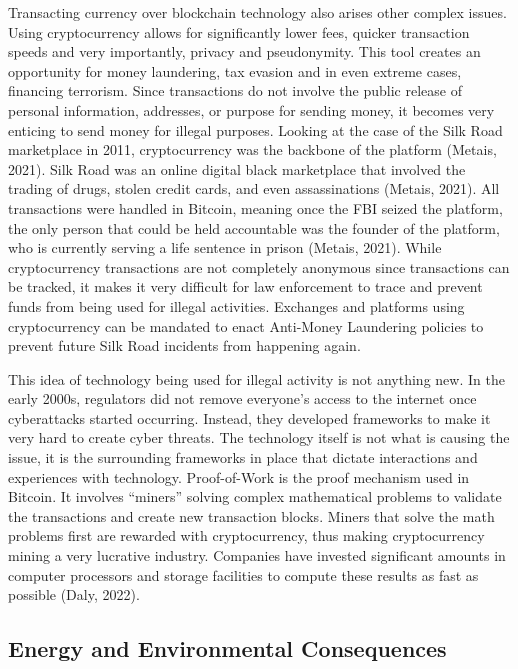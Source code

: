 \documentclass{article}
\begin{document}
\noindent 
Transacting currency over blockchain technology also arises other complex issues. Using cryptocurrency allows for significantly lower fees, quicker transaction speeds and very importantly, privacy and pseudonymity. This tool creates an opportunity for money laundering, tax evasion and in even extreme cases, financing terrorism. Since transactions do not involve the public release of personal information, addresses, or purpose for sending money, it becomes very enticing to send money for illegal purposes. Looking at the case of the Silk Road marketplace in 2011, cryptocurrency was the backbone of the platform (Metais, 2021). Silk Road was an online digital black marketplace that involved the trading of drugs, stolen credit cards, and even assassinations (Metais, 2021). All transactions were handled in Bitcoin, meaning once the FBI seized the platform, the only person that could be held accountable was the founder of the platform, who is currently serving a life sentence in prison (Metais, 2021). While cryptocurrency transactions are not completely anonymous since transactions can be tracked, it makes it very difficult for law enforcement to trace and prevent funds from being used for illegal activities. Exchanges and platforms using cryptocurrency can be mandated to enact Anti-Money Laundering policies to prevent future Silk Road incidents from happening again.

\noindent \newline This idea of technology being used for illegal activity is not anything new. In the early 2000s, regulators did not remove everyone’s access to the internet once cyberattacks started occurring. Instead, they developed frameworks to make it very hard to create cyber threats. The technology itself is not what is causing the issue, it is the surrounding frameworks in place that dictate interactions and experiences with technology. Proof-of-Work is the proof mechanism used in Bitcoin. It involves “miners” solving complex mathematical problems to validate the transactions and create new transaction blocks. Miners that solve the math problems first are rewarded with cryptocurrency, thus making cryptocurrency mining a very lucrative industry. Companies have invested significant amounts in computer processors and storage facilities to compute these results as fast as possible (Daly, 2022).
\subsection{Energy and Environmental Consequences}
\end{document}
